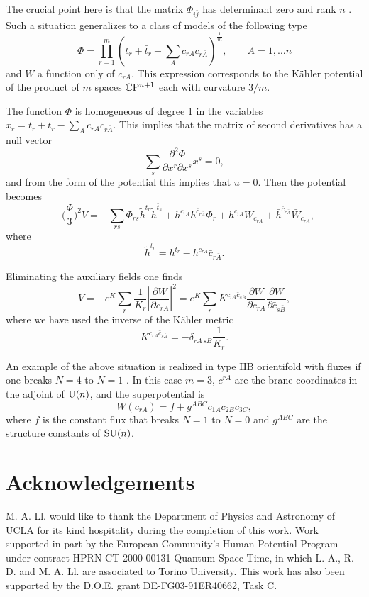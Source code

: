 \documentclass[a4paper,12pt]{article}
\begin{document}
 The crucial point here is that the matrix $\Phi_{i\bar j}$ has determinant zero and  rank $n$
\cite{bcf}. Such a situation generalizes to a class of models of
the following type $$\Phi=\prod _{r=1}^m(t_r+\bar t_r -\sum_A
c_{rA} c_{r\bar A})^\frac 1 m, \qquad A=1,\dots n$$ and $W$ a
function only of $c_{rA}$. This expression corresponds to the
K\"ahler potential of the product of $m$ spaces
$\mathbb{C}\mathrm{P}^{n+1}$ each with curvature $3/m$.

The function $\Phi$ is homogeneous of degree 1 in the variables $x_r=t_r+\bar t_r -
\sum_A c_{rA} c_{r\bar A}$. This implies that the matrix of second derivatives has a null vector
$$\sum_s\frac{\partial^2\Phi}{\partial x^r\partial x^s}x^s=0,$$ and from the form of the potential
this
implies that $u=0$. Then the potential becomes
$$-\bigl(\frac \Phi 3 \bigr)^2V= -\sum_{rs}\Phi_{rs}{\tilde h}^{t_r}{\tilde h}^{\bar t_s} +h^{c_{rA}}
h^{\bar c_{r\bar A}}\Phi_r+ h^{c_{rA}}W_{c_{rA}}+\bar h^{\bar c_{r\bar A}}\bar W_{c_{rA}},$$
where
$${\tilde h}^{t_r}={ h}^{t_r}-h^{c_{rA}}\bar c_{r\bar A}.$$

Eliminating the auxiliary fields one finds
$$V=-e^K\sum_r\frac{1}{K_r}|\frac{\partial W}{\partial c_{rA}}|^2=
e^K\sum_rK^{c_{rA}\bar c_{s\bar B}}\frac{\partial W}{\partial
c_{rA}} \frac{\partial \bar W}{\partial \bar c_{s\bar B}},$$ where
we have used the inverse of the K\"ahler metric $$K^{c_{rA}\bar
c_{s\bar B}}=-\delta_{rA \, s\bar B}\frac 1{K_{r}}.$$

\bigskip

An example of the above situation is realized in type IIB
orientifold with fluxes if one breaks $N=4$ to $N=1$ \cite{fpo}.
In this case $m=3$, $c^{rA}$ are the brane coordinates in the
adjoint of $\mathrm{U}(n)$, and the superpotential is
$$W(c_{rA})=f+g^{ABC}c_{1A}c_{2B}c_{3C},$$ where $f$ is the
constant flux that breaks $N=1$ to $N=0$ and $g^{ABC}$ are the
structure constants of $\mathrm{SU}(n)$.


\section*{Acknowledgements}

 M. A. Ll. would like to thank the Department of Physics and Astronomy of UCLA for its
kind hospitality during the  completion of this work. Work
supported in part by the European Community's Human Potential
Program under contract HPRN-CT-2000-00131 Quantum Space-Time, in
which L. A.,  R. D. and M. A. Ll. are associated to Torino
University. This work has also  been supported by the
D.O.E. grant DE-FG03-91ER40662, Task C.
\end{document}
